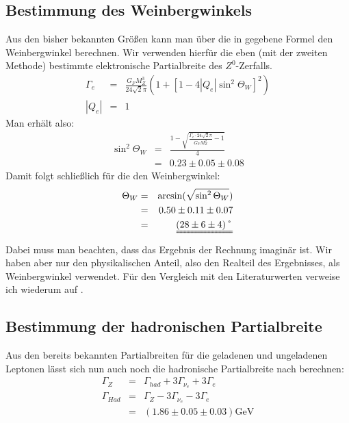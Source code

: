 \subsection{Bestimmung des Weinbergwinkels}
Aus den bisher bekannten Größen kann man über die in \cite[Gl.6]{script} gegebene Formel den Weinbergwinkel berechnen. Wir verwenden hierfür die eben (mit der zweiten Methode) bestimmte elektronische Partialbreite des $Z^0$-Zerfalls.
\begin{eqnarray}
\Gamma_e &=& \frac{G_F M_Z^3}{24 \sqrt{2}\pi}\left(1+[1-4|Q_e|\sin^2\Theta_W]^2\right)\\
|Q_e| &=& 1
\end{eqnarray}
Man erhält also:
\begin{eqnarray}
\sin^2\Theta_W &=& \frac{1-\sqrt{\frac{\Gamma_e\cdot 24\sqrt{2}\pi}{G_FM_Z^3}-1}}{4}\\
\nonumber &=& 0.23 \pm 0.05 \pm 0.08
\end{eqnarray}
Damit folgt schließlich für die den Weinbergwinkel:
\begin{eqnarray}
\Theta_W &=& \arcsin(\sqrt{\sin^2\Theta_W})\\
\nonumber &=& 0.50 \pm 0.11 \pm 0.07\\
\nonumber &=& \uuline{(28 \pm 6 \pm 4)\symbol{23}}
\end{eqnarray}
Dabei muss man beachten, dass das Ergebnis der Rechnung imaginär ist. Wir haben aber nur den physikalischen Anteil, also den Realteil des Ergebnisses, als Weinbergwinkel verwendet. Für den Vergleich mit den Literaturwerten verweise ich wiederum auf \cite[Kap. 5]{kap5}.

\subsection{Bestimmung der hadronischen Partialbreite}
Aus den bereits bekannten Partialbreiten für die geladenen und ungeladenen Leptonen lässt sich nun auch noch die hadronische Partialbreite nach \cite[Gl.8]{script} berechnen:
\begin{eqnarray}
\Gamma_Z &=& \Gamma_{had} + 3\Gamma_{\nu_e} + 3\Gamma_e\\
\Gamma_{Had} &=& \Gamma_Z - 3\Gamma_{\nu_e} - 3\Gamma_e\\
\nonumber &=& (1.86 \pm 0.05 \pm 0.03)\si{\giga\electronvolt}
\end{eqnarray}

